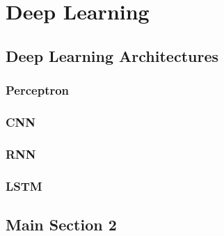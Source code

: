 
\chapter{Deep Learning} %

\label{Chapter1} %


\section{Deep Learning Architectures}

\subsection{Perceptron}

\subsection{CNN}


\subsection{RNN}



\subsection{LSTM}


\section{Main Section 2}
